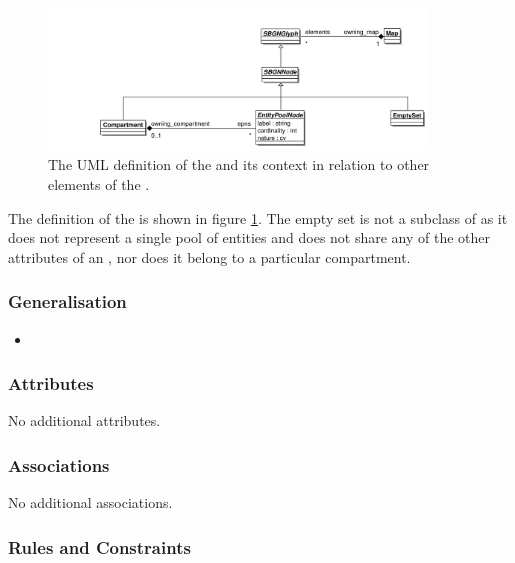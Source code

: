 \begin{figure}[htb]
  \centering
  \includegraphics[width=0.9\textwidth]{images/emptysetuml}
  \caption{The UML definition of the  and its context
    in relation to other elements of the \PDl.}
  \label{fig:techref:emptysetuml}
\end{figure}

The definition of the  is shown in figure
\ref{fig:techref:emptysetuml}. The empty set is not a subclass of  as it does not
represent a single pool of entities and does not share any of the
other attributes of an , nor does it belong to a particular
compartment.

\subsubsection{Generalisation}

\begin{itemize}
\item {}
\end{itemize}

\subsubsection{Attributes}

No additional attributes.

\subsubsection{Associations}

No additional associations.

\subsubsection{Rules and Constraints}

\begin{valrules}
\end{valrules}

